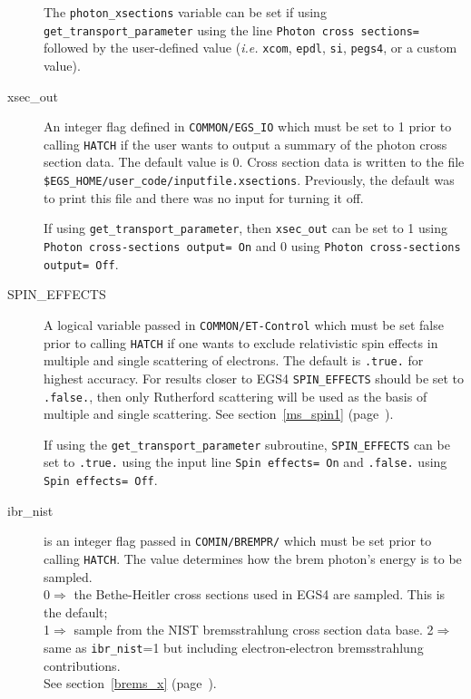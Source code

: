 \begin{description}
The {\tt photon\_xsections} variable can be set if using
{\tt get\_transport\_parameter} using the line
{\tt Photon cross sections= } followed by the user-defined value
({\em i.e.} {\tt xcom}, {\tt epdl}, {\tt si}, {\tt pegs4}, or
a custom value).

\item[xsec\_out] An integer flag defined in {\tt COMMON/EGS\_IO} which must
be set to 1 prior to calling {\tt HATCH} if the user wants to output a summary
of the photon cross section data.  The default value is 0.  Cross section
data is written to the file\\ {\tt \$EGS\_HOME/user\_code/inputfile.xsections}.
Previously, the default was to print this file and
there was no input for turning it off.

If using {\tt get\_transport\_parameter}, then {\tt xsec\_out} can be set
to 1 using {\tt Photon cross-sections output= On} and 0 using
{\tt Photon cross-sections output= Off}.

\item[SPIN\_EFFECTS] A logical variable passed in {\tt COMMON/ET-Control}
which must be set false prior to calling {\tt HATCH} if one wants to exclude
relativistic spin effects in multiple and single scattering of electrons.
The default is {\tt .true.} for highest accuracy. For results
closer to EGS4 {\tt SPIN\_EFFECTS} should be set to {\tt .false.},
then only Rutherford scattering will be used as the
basis of multiple and single scattering.  See section~\ref{ms_spin1}
(page~\pageref{ms_spin1}).

If using the {\tt get\_transport\_parameter} subroutine, {\tt SPIN\_EFFECTS} can
be set to {\tt .true.} using the input line
{\tt Spin effects= On} and {\tt .false.} using {\tt Spin effects= Off}.


\item[ibr\_nist] is an integer flag passed in {\tt COMIN/BREMPR/} which
must be set prior to calling {\tt HATCH}. The value
determines how the brem photon's energy is to be sampled.\\
0$\Rightarrow$ the Bethe-Heitler cross sections used in EGS4 are sampled.
This is the default;\\
1$\Rightarrow$ sample from the NIST bremsstrahlung cross section data
base\cite{SB85,SB86a}.
2$\Rightarrow$ same as {\tt ibr\_nist}=1 but including electron-electron
bremsstrahlung contributions.
\\ See section~\ref{brems_x}
(page~\pageref{brems_x}).


\end{description}
